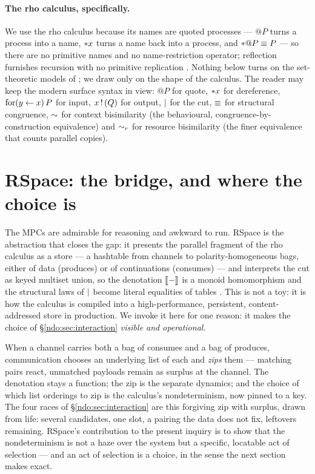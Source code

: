 \paragraph{The rho calculus, specifically.}
We use the rho calculus because its names are quoted processes --- $@P$ turns a
process into a name, ${*} x$ turns a name back into a process, and
${*} @P \equiv P$ --- so there are no primitive names and no name-restriction
operator; reflection furnishes recursion with no primitive replication \cite{RHO}.
Nothing below turns on the set-theoretic models of \cite{qcs,knot}; we draw only on
the shape of the calculus. The reader may keep the modern surface syntax in view:
$@P$ for quote, ${*} x$ for dereference, $\mathrm{for}(y \leftarrow x)\,P$ for input, $x\,!\,(Q)$
for output, $\mid$ for the cut, $\equiv$ for structural congruence, $\sim$ for
context bisimilarity (the behavioural, congruence-by-construction equivalence) and
$\sim_{r}$ for resource bisimilarity (the finer equivalence that counts parallel
copies).


\section{RSpace: the bridge, and where the choice is}\label{ndo:sec:rspace}

The MPCs are admirable for reasoning and awkward to run. RSpace is the abstraction
that closes the gap: it presents the parallel fragment of the rho calculus as a
store --- a hashtable from channels to polarity-homogeneous bags, either of data
(produces) or of continuations (consumes) --- and interprets the cut as keyed
multiset union, so the denotation $\llbracket - \rrbracket$ is a monoid homomorphism and the
structural laws of $\mid$ become literal equalities of tables \cite{qcs}. This is
not a toy: it is how the calculus is compiled into a high-performance, persistent,
content-addressed store in production. We invoke it here for one reason: it makes
the choice of \S\ref{ndo:sec:interaction} \emph{visible and operational}.

When a channel carries both a bag of consumes and a bag of produces, communication
chooses an underlying list of each and \emph{zips} them --- matching pairs react,
unmatched payloads remain as surplus at the channel. The denotation stays a
function; the zip is the separate dynamics; and the choice of which list orderings
to zip is the calculus's nondeterminism, now pinned to a key. The four races of
\S\ref{ndo:sec:interaction} are this forgiving zip with surplus, drawn from life:
several candidates, one slot, a pairing the data does not fix, leftovers remaining.
RSpace's contribution to the present inquiry is to show that the nondeterminism is
not a haze over the system but a specific, locatable act of selection --- and an act
of selection is a choice, in the sense the next section makes exact.

